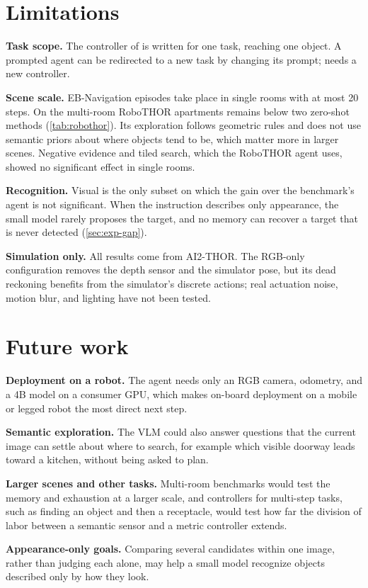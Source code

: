 \section{Limitations}
\noindent\textbf{Task scope.} The controller of \ours is written for one task, reaching one object. A prompted agent
can be redirected to a new task by changing its prompt; \ours needs a new controller.

\noindent\textbf{Scene scale.} EB-Navigation episodes take place in single rooms with at most 20 steps. On the
multi-room RoboTHOR apartments \ours remains below two zero-shot methods (\cref{tab:robothor}). Its exploration
follows geometric rules and does not use semantic priors about where objects tend to be, which matter more in larger
scenes. Negative evidence and tiled search, which the RoboTHOR agent uses, showed no significant effect in single
rooms.

\noindent\textbf{Recognition.} Visual is the only subset on which the gain over the benchmark's agent is not
significant. When the
instruction describes only appearance, the small model rarely proposes the target, and no memory can recover a target
that is never detected (\cref{sec:exp-gap}).

\noindent\textbf{Simulation only.} All results come from AI2-THOR. The RGB-only configuration removes the depth sensor
and the simulator pose, but its dead reckoning benefits from the simulator's discrete actions; real actuation noise,
motion blur, and lighting have not been tested.

\section{Future work}
\noindent\textbf{Deployment on a robot.} The agent needs only an RGB camera, odometry, and a 4B model on a consumer
GPU, which makes on-board deployment on a mobile or legged robot the most direct next step.

\noindent\textbf{Semantic exploration.} The VLM could also answer questions that the current image can settle about
where to search, for example which visible doorway leads toward a kitchen, without being asked to plan.

\noindent\textbf{Larger scenes and other tasks.} Multi-room benchmarks would test the memory and exhaustion at a larger scale, and controllers for multi-step tasks, such as finding an object and then a receptacle, would test how
far the division of labor between a semantic sensor and a metric controller extends.

\noindent\textbf{Appearance-only goals.} Comparing several candidates within one image, rather than judging each
alone, may help a small model recognize objects described only by how they look.

